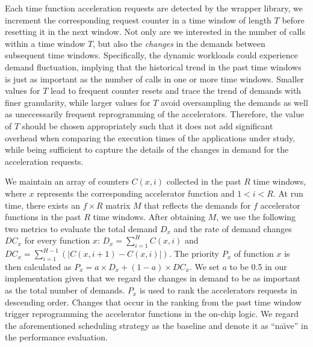 Each time function acceleration requests are detected by the
wrapper library, we increment the corresponding request counter in a
time window of length $T$ before resetting it in the next window. 
Not only are we interested in the number of calls within a time window $T$, but also the {\em changes} in the demands
between subsequent time windows. Specifically, the dynamic workloads
could experience demand fluctuation, implying that the historical trend in the
past time windows is just as important as the number of calls in one or
more time windows.
Smaller values for $T$ lead to frequent counter resets and trace the trend
of demands with finer granularity, while larger values for $T$ avoid
oversampling the demands as well as uneccessarily frequent reprogramming of the accelerators. Therefore, the value of $T$ should be chosen
appropriately such that it does not add significant overhead when
comparing the execution times of the applications under study, while being sufficient
to capture the details of the changes in demand for the acceleration requests. 

We maintain an array of counters $C(x, i)$ collected in the past $R$
time windows, where $x$ represents the corresponding accelerator
function and $1<i<R$. At run time, there exists an $f \times R$
matrix $M$ that reflects the demands for $f$ accelerator functions in
the past $R$ time windows.  After obtaining $M$, we use the following
two metrics to evaluate the total demand $D_x$ and the rate of demand
changes $DC_x$ for every function $x$: $D_{x} = \sum_{i=1}^{H}C(x,i)$
and $DC_{x} = \sum_{i=1}^{H-1}(|C(x, i+1)-C(x, i)|)$.  The priority
$P_x$ of function $x$ is then calculated as $P_x = a \times D_x +
(1-a) \times DC_x$. We set $a$ to be 0.5 in our implementation given that we
regard the changes in demand to be as important as the total number of demands. $P_x$
is used to rank the accelerators requests in descending
order. Changes that occur in the ranking from the past time window trigger
reprogramming the accelerator functions in the on-chip logic. We regard the aforementioned scheduling strategy as the baseline and denote it as ``na\"{\i}ve'' in the performance evaluation.




